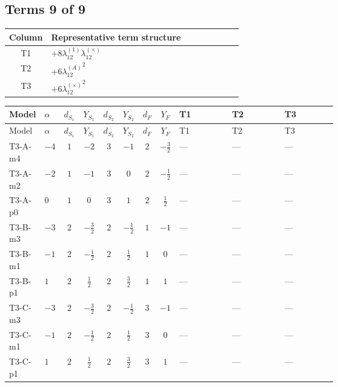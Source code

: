 \documentclass[8pt]{article}
\begin{document}
\begin{landscape}
\subsection*{Terms 9 of 9}
\begin{center}
\begin{tabular}{@{}c >{\raggedright\arraybackslash}p{0.82\linewidth}@{}}
\toprule
Column & Representative term structure \\
\midrule
T1 & \(\displaystyle +8 {\lambda_{12}^{(1)}} {\lambda_{12}^{(\times)}}\) \\
\midrule
T2 & \(\displaystyle +6 {\lambda_{12}^{(A)}}^2\) \\
\midrule
T3 & \(\displaystyle +6 {\lambda_{12}^{(\times)}}^2\) \\
\midrule
\bottomrule
\end{tabular}
\end{center}
\smallskip
\tiny
\begin{longtable}{@{}llcccccc >{\raggedright\arraybackslash}p{0.21\linewidth} >{\raggedright\arraybackslash}p{0.21\linewidth} >{\raggedright\arraybackslash}p{0.21\linewidth}@{}}
\toprule
Model & $\alpha$ & $d_{S_1}$ & $Y_{S_1}$ & $d_{S_2}$ & $Y_{S_2}$ & $d_F$ & $Y_F$ & T1 & T2 & T3 \\
\midrule
\endfirsthead
\toprule
Model & $\alpha$ & $d_{S_1}$ & $Y_{S_1}$ & $d_{S_2}$ & $Y_{S_2}$ & $d_F$ & $Y_F$ & T1 & T2 & T3 \\
\midrule
\endhead
T3-A-m4 & $-4$ & $1$ & $-2$ & $3$ & $-1$ & $2$ & $-\frac{3}{2}$ & --- & --- & --- \\
\midrule
T3-A-m2 & $-2$ & $1$ & $-1$ & $3$ & $0$ & $2$ & $-\frac{1}{2}$ & --- & --- & --- \\
\midrule
T3-A-p0 & $0$ & $1$ & $0$ & $3$ & $1$ & $2$ & $\frac{1}{2}$ & --- & --- & --- \\
\midrule
T3-B-m3 & $-3$ & $2$ & $-\frac{3}{2}$ & $2$ & $-\frac{1}{2}$ & $1$ & $-1$ & --- & --- & --- \\
\midrule
T3-B-m1 & $-1$ & $2$ & $-\frac{1}{2}$ & $2$ & $\frac{1}{2}$ & $1$ & $0$ & --- & --- & --- \\
\midrule
T3-B-p1 & $1$ & $2$ & $\frac{1}{2}$ & $2$ & $\frac{3}{2}$ & $1$ & $1$ & --- & --- & --- \\
\midrule
T3-C-m3 & $-3$ & $2$ & $-\frac{3}{2}$ & $2$ & $-\frac{1}{2}$ & $3$ & $-1$ & --- & --- & --- \\
\midrule
T3-C-m1 & $-1$ & $2$ & $-\frac{1}{2}$ & $2$ & $\frac{1}{2}$ & $3$ & $0$ & --- & --- & --- \\
\midrule
T3-C-p1 & $1$ & $2$ & $\frac{1}{2}$ & $2$ & $\frac{3}{2}$ & $3$ & $1$ & --- & --- & --- \\

\end{longtable}
\end{landscape}
\end{document}
